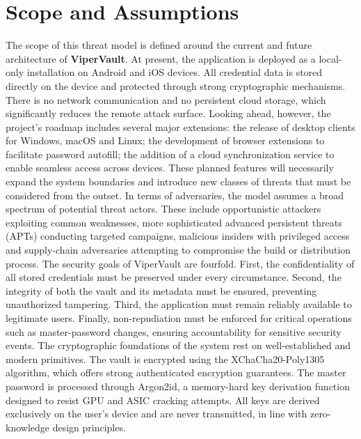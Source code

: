 \section{Scope and Assumptions}
	
	The scope of this threat model is defined around the current and future architecture of \textbf{ViperVault}.
	At present, the application is deployed as a local-only installation on Android and iOS devices.
	All credential data is stored directly on the device and protected through strong cryptographic mechanisms.
	There is no network communication and no persistent cloud storage, which significantly reduces the remote attack surface.
	Looking ahead, however, the project’s roadmap includes several major extensions: the release of desktop clients for Windows, macOS and Linux; the development of browser extensions to facilitate password autofill;  the addition of a cloud synchronization service to enable seamless access across devices.
	These planned features will necessarily expand the system boundaries and introduce new classes of threats that must be considered from the outset.
	In terms of adversaries, the model assumes a broad spectrum of potential threat actors.
	These include opportunistic attackers exploiting common weaknesses, more sophisticated advanced persistent threats (APTs) conducting targeted campaigns, malicious insiders with privileged access and supply-chain adversaries attempting to compromise the build or distribution process.
	The security goals of ViperVault are fourfold.
	First, the confidentiality of all stored credentials must be preserved under every circumstance.
	Second, the integrity of both the vault and its metadata must be ensured, preventing unauthorized tampering.
	Third, the application must remain reliably available to legitimate users.
	Finally, non-repudiation must be enforced for critical operations such as master-password changes, ensuring accountability for sensitive security events.
	The cryptographic foundations of the system rest on well-established and modern primitives.
	The vault is encrypted using the XChaCha20-Poly1305 algorithm, which offers strong authenticated encryption guarantees.
	The master password is processed through Argon2id, a memory-hard key derivation function designed to resist GPU and ASIC cracking attempts.
	All keys are derived exclusively on the user’s device and are never transmitted, in line with zero-knowledge design principles.